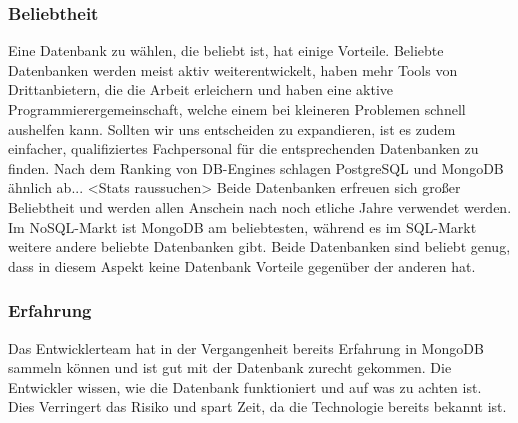 \subsubsection{Beliebtheit}
Eine Datenbank zu wählen, die beliebt ist, hat einige Vorteile. Beliebte Datenbanken werden meist aktiv weiterentwickelt, haben mehr Tools von Drittanbietern, die die Arbeit erleichern und haben eine aktive Programmierergemeinschaft, welche einem bei kleineren Problemen schnell aushelfen kann. Sollten wir uns entscheiden zu expandieren, ist es zudem einfacher, qualifiziertes Fachpersonal für die entsprechenden Datenbanken zu finden.
Nach dem Ranking von DB-Engines schlagen PostgreSQL und MongoDB ähnlich ab... <Stats raussuchen>
Beide Datenbanken erfreuen sich großer Beliebtheit und werden allen Anschein nach noch etliche Jahre verwendet werden. Im NoSQL-Markt ist MongoDB am beliebtesten, während es im SQL-Markt weitere andere beliebte Datenbanken gibt. Beide Datenbanken sind beliebt genug, dass in diesem Aspekt keine Datenbank Vorteile gegenüber der anderen hat.

\subsubsection{Erfahrung}
Das Entwicklerteam hat in der Vergangenheit bereits Erfahrung in MongoDB sammeln können und ist gut mit der Datenbank zurecht gekommen. Die Entwickler wissen, wie die Datenbank funktioniert und auf was zu achten ist. Dies Verringert das Risiko und spart Zeit, da die Technologie bereits bekannt ist.

